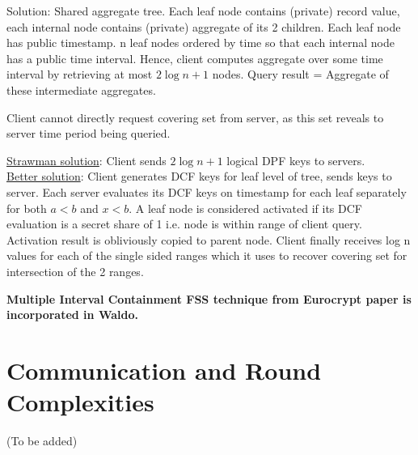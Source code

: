 Solution: Shared aggregate tree. Each leaf node contains (private) record value, each internal node contains (private) aggregate of its 2 children. Each leaf node has public timestamp. n leaf nodes ordered by time so that each internal node has a public time interval. Hence, client computes aggregate over some time interval by retrieving at most $2\log n + 1$ nodes. Query result = Aggregate of these intermediate aggregates.

Client cannot directly request covering set from server, as this set reveals to server time period being queried.

\underline{Strawman solution}: Client sends $2\log n + 1$ logical DPF keys to servers. \\
\underline{Better solution}: Client generates DCF keys for leaf level of tree, sends keys to server. Each server evaluates its DCF keys on timestamp for each leaf separately for both $a < b$ and $x < b$. A leaf node is considered activated if its DCF evaluation is a secret share of 1 i.e. node is within range of client query. Activation result is obliviously copied to parent node. Client finally receives log n values for each of the single sided ranges which it uses to recover covering set for intersection of the 2 ranges.

\textbf{Multiple Interval Containment FSS technique from Eurocrypt paper is incorporated in Waldo.}

\section{Communication and Round Complexities}
(To be added)




%
